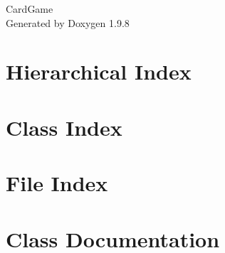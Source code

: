 \documentclass[twoside]{book}
\newcommand{\+}{\discretionary{\mbox{\scriptsize$\hookleftarrow$}}{}{}}
\newcommand{\clearemptydoublepage}{%
    \newpage{\pagestyle{empty}\cleardoublepage}%
  }
\begin{document}
  \raggedbottom
    \hypersetup{pageanchor=false,
                bookmarksnumbered=true,
                pdfencoding=unicode
               }
  \begin{titlepage}
  \vspace*{7cm}
  \begin{center}%
  {\Large Card\+Game}\\
  \vspace*{1cm}
  {\large Generated by Doxygen 1.9.8}\\
  \end{center}
  \end{titlepage}
  \clearemptydoublepage
  \tableofcontents
  \clearemptydoublepage
  \hypersetup{pageanchor=true}






\chapter{Hierarchical Index}

\chapter{Class Index}

\chapter{File Index}

\chapter{Class Documentation}

























\end{document}
